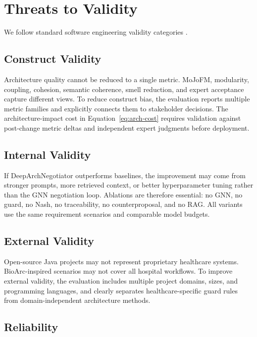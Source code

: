 \documentclass[english,preprint,nonatbib]{elsarticle}
\begin{document}
\section{Threats to Validity}
\label{sec:validity}

We follow standard software engineering validity categories \cite{wohlin2012experimentation}.

\subsection{Construct Validity}

Architecture quality cannot be reduced to a single metric.
MoJoFM, modularity, coupling, cohesion, semantic coherence, smell reduction, and expert acceptance capture different views.
To reduce construct bias, the evaluation reports multiple metric families and explicitly connects them to stakeholder decisions.
The architecture-impact cost in Equation~\ref{eq:arch-cost} requires validation against post-change metric deltas and independent expert judgments before deployment.

\subsection{Internal Validity}

If DeepArchNegotiator outperforms baselines, the improvement may come from stronger prompts, more retrieved context, or better hyperparameter tuning rather than the GNN negotiation loop.
Ablations are therefore essential: no GNN, no guard, no Nash, no traceability, no counterproposal, and no RAG\@.
All variants use the same requirement scenarios and comparable model budgets.

\subsection{External Validity}

Open-source Java projects may not represent proprietary healthcare systems. BioArc-inspired scenarios may not cover all hospital workflows.
To improve external validity, the evaluation includes multiple project domains, sizes, and programming languages, and clearly separates healthcare-specific guard rules from domain-independent architecture methods.

\subsection{Reliability}
\end{document}
